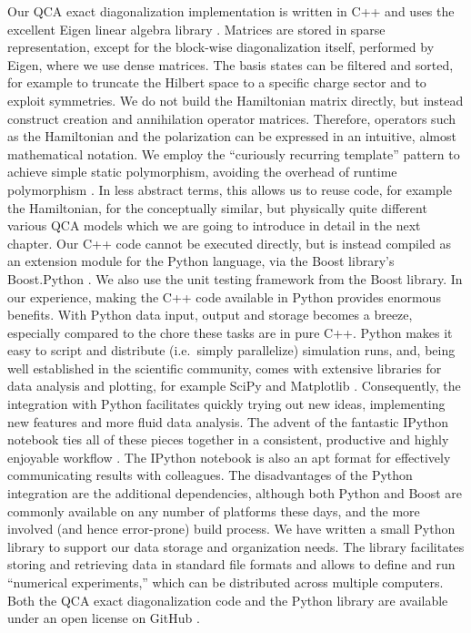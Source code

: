 Our QCA exact diagonalization implementation is written in C++ and uses the
excellent Eigen linear algebra library \cite{eigen}. Matrices are stored in
sparse representation, except for the block-wise diagonalization itself,
performed by Eigen, where we use dense matrices. The basis states can be
filtered and sorted, for example to truncate the Hilbert space to a specific
charge sector and to exploit symmetries. We do not build the Hamiltonian matrix
directly, but instead construct creation and annihilation operator matrices.
Therefore, operators such as the Hamiltonian and the polarization can be
expressed in an intuitive, almost mathematical notation. We employ the
``curiously recurring template'' pattern to achieve simple static polymorphism,
avoiding the overhead of runtime polymorphism \cite{andrei2001modern}. In less
abstract terms, this allows us to reuse code, for example the Hamiltonian, for
the conceptually similar, but physically quite different various QCA models
which we are going to introduce in detail in the next chapter. Our C++ code
cannot be executed directly, but is instead compiled as an extension module for
the Python language, via the Boost library's Boost.Python \cite{boost}. We also
use the unit testing framework from the Boost library. In our experience, making
the C++ code available in Python provides enormous benefits. With Python data
input, output and storage becomes a breeze, especially compared to the chore
these tasks are in pure C++. Python makes it easy to script and distribute
(i.e.\ simply parallelize) simulation runs, and, being well established in the
scientific community, comes with extensive libraries for data analysis and
plotting, for example SciPy and Matplotlib \cite{scipy}
\cite{hunter2007matplotlib}. Consequently, the integration with Python
facilitates quickly trying out new ideas, implementing new features and more
fluid data analysis. The advent of the fantastic IPython notebook ties all of
these pieces together in a consistent, productive and highly enjoyable workflow
\cite{perez2007ipython}. The IPython notebook is also an apt format for
effectively communicating results with colleagues. The disadvantages of the
Python integration are the additional dependencies, although both Python and
Boost are commonly available on any number of platforms these days, and the more
involved (and hence error-prone) build process. We have written a small Python
library to support our data storage and organization needs. The library
facilitates storing and retrieving data in standard file formats and allows to
define and run ``numerical experiments,'' which can be distributed across
multiple computers. Both the QCA exact diagonalization code and the Python
library are available under an open license on GitHub \cite{githubqca}
\cite{githubcoma}.
